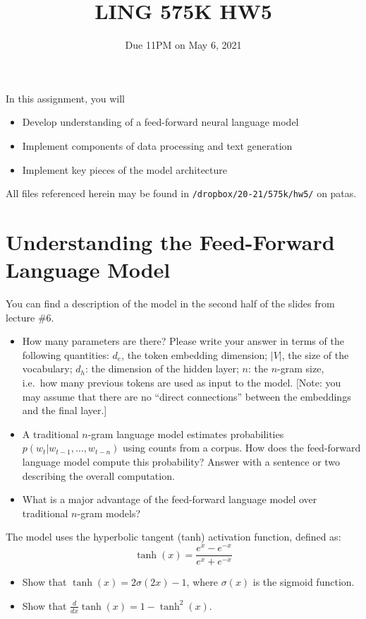 \documentclass[11pt]{article}
\begin{document}
\title{LING 575K HW5}
\date{\vspace{-0.2in}Due 11PM on May 6, 2021}
\maketitle


\noindent In this assignment, you will 
\begin{itemize}
  \item Develop understanding of a feed-forward neural language model
  \item Implement components of data processing and text generation
  \item Implement key pieces of the model architecture
\end{itemize}
All files referenced herein may be found in \texttt{/dropbox/20-21/575k/hw5/} on patas.


\section{Understanding the Feed-Forward Language Model}

  You can find a description of the model in the second half of the slides from lecture \#6.
\begin{itemize}
  \item How many parameters are there?  Please write your answer in terms of the following quantities: $d_e$, the token embedding dimension; $|V|$, the size of the vocabulary; $d_h$: the dimension of the hidden layer; $n$: the $n$-gram size, i.e.\ how many previous tokens are used as input to the model.  [Note: you may assume that there are no ``direct connections'' between the embeddings and the final layer.]
  \item A traditional $n$-gram language model estimates probabilities $p(w_t | w_{t-1} , \dots , w_{t-n})$ using counts from a corpus.  How does the feed-forward language model compute this probability?  Answer with a sentence or two describing the overall computation.
  \item What is a major advantage of the feed-forward language model over traditional $n$-gram models?
\end{itemize}


\vspace{2em}
 The model uses the hyperbolic tangent (tanh) activation function, defined as:
\[ \tanh(x) = \frac{e^x - e^{-x}}{e^x + e^{-x}} \]
\begin{itemize}
  \item Show that $\tanh(x) = 2\sigma(2x) - 1$, where $\sigma(x)$ is the sigmoid function.
  \item Show that $\frac{d}{dx}\tanh(x) = 1 - \tanh^2(x)$.
\end{itemize}
\end{document}
